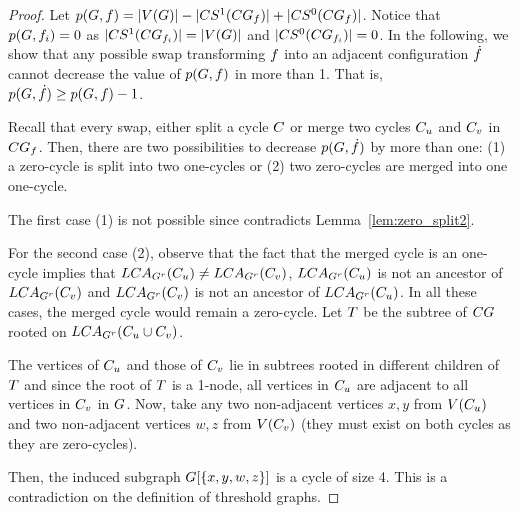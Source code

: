 \documentclass[msc,english,table,xcdraw]{ppgccufmg}
\begin{document}
\begin{proof}
    Let $p(G, f) = |V(G)| - 
    |CS^{1}(CG_{f})| +
    |CS^{0}(CG_{f})|$.
    Notice that $p(G, f_{i}) = 0$ as $|CS^{1}(CG_{f_{i}})| = |V(G)|$ and $|CS^{0}(CG_{f_{i}})| = 0$.
    In the following, we show that any possible swap transforming $f$ into an adjacent configuration $\dot{f}$ cannot decrease the value of $p(G, f)$ in more than 1. That is, $p(G, \dot{f}) \ge p(G, f) - 1$. 
    
    Recall that every swap, either split a cycle $C$ or merge two cycles $C_{u}$ and $C_{v}$ in $CG_{f}$. 
    Then, there are two possibilities to decrease $p(G, \dot{f})$ by more than one: (1) a zero-cycle is split into two one-cycles or (2) two zero-cycles are merged into one one-cycle.
    
    The first case (1) is not possible since contradicts Lemma~\ref{lem:zero_split2}.
    
    For the second case (2), observe that the fact that the merged cycle is an one-cycle implies that $LCA_{G^{r}}(C_{u}) \ne LCA_{G^{r}}(C_{v})$, $LCA_{G^{r}}(C_{u})$ is not an ancestor of $LCA_{G^{r}}(C_{v})$ and $LCA_{G^{r}}(C_{v})$ is not an ancestor of $LCA_{G^{r}}(C_{u})$. 
    In all these cases, the merged cycle would remain a zero-cycle. 
    Let $T$ be the subtree of $CG$ rooted on $LCA_{G^{r}}(C_{u} \cup C_{v})$.
    
    The vertices of $C_{u}$ and those of $C_{v}$ lie in subtrees rooted in different  children of $T$ and since the root of $T$ is a 1-node, all vertices in $C_{u}$ are adjacent to all vertices in $C_{v}$ in $G$. 
    Now, take any two non-adjacent vertices $x,y$ from $V(C_{u})$ and two non-adjacent vertices $w,z$ from $V(C_{v})$ (they must exist on both cycles as they are zero-cycles). 
            
    Then, the induced subgraph $G[\{x,y,w,z\}]$ is a cycle of size 4. 
    This is a contradiction on the definition of threshold graphs. 


\end{proof}
\end{document}

